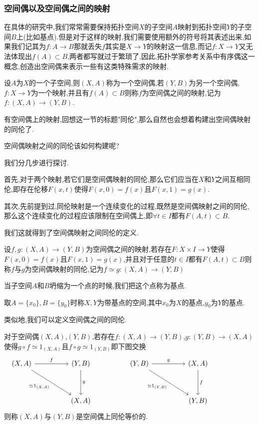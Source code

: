 \documentclass{article}
\begin{document}
\subsubsection{空间偶以及空间偶之间的映射}
在具体的研究中,我们常常需要保持拓扑空间$X$的子空间$A$映射到拓扑空间$Y$的子空间$B$上(比如基点).但是对于这样的映射,我们需要使用额外的符号将其表述出来,如果我们记其为$f : A \to B$那就丢失$f$其实是$X \to Y$的映射这一信息,而记$f : X \to Y$又无法体现出$f(A) \subset B$,两者都写就过于繁琐了,因此,拓扑学家参考关系中有序偶这一概念,创造出空间偶来表示一些有这类特殊需求的映射.

\begin{definition}
    设$A$为$X$的一个子空间,则$(X,A)$称为一个空间偶,若$(Y,B)$为另一个空间偶,$f : X \to Y$为一个映射,并且有$f(A) \subset B$则称$f$为空间偶之间的映射,记为$f: (X,A) \to (Y,B)$.
    \label{Def:1.2.4}
\end{definition}

有空间偶上的映射,回想这一节的标题"同伦",那么自然也会想着构建出空间偶映射的同伦了.


空间偶映射之间的同伦该如何构建呢?


我们分几步进行探讨.


首先,对于两个映射,若它们是空间偶映射的同伦,那么它们应当在$X$和$Y$之间互相同伦,即存在伦移$F(x,t)$使得$F(x,0) = f(x)$且$F(x,1) = g(x)$.


其次,先前提到过,同伦映射是一个连续变化的过程,既然是空间偶映射之间的同伦,那么这个连续变化的过程应该限制在空间偶上,即$\forall t \in I$都有$F(A,t) \subset B$.


我们这就得到了空间偶映射之间同伦的定义.


\begin{definition}
    设$f,g : (X,A) \to (Y,B)$为空间偶之间的映射,若存在$F: X \times I \to Y$使得$F(x,0) = f(x)$且$F(x,1) = g(x)$,并且对于任意的$t \in I$都有$F(A,t) \subset B$则称$f$与$g$为空间偶映射的同伦,记为$f\simeq g:(X,A) \to (Y,B)$
\end{definition}

当子空间$A$和$B$坍缩为一个点的时候,我们把这个点称为基点.

\begin{definition}
    取$A = \{x_0\}, B = \{y_0\}$时称$X,Y$为带基点的空间,其中$x_0$为$X$的基点,$y_0$为$Y$的基点.
\end{definition}

类似地,我们可以定义空间偶之间的同伦.

\begin{definition}
    对于空间偶$(X,A)$,$(Y,B)$,若存在$f :(X,A) \to (Y,B)$,$g : (Y,B) \to (X,A)$使得$g \circ f\simeq 1_{(X,A)}$且$f \circ g \simeq 1_{(Y,B)}$即下图交换
    \[\begin{tikzcd}
	{(X,A)} && {(Y,B)} && {(Y,B)} && {(X,A)} \\
	\\
	&& {(X,A)} &&&& {(Y,B)} 
	&& {}
	\arrow["g", from=1-3, to=3-3]
	\arrow["f", from=1-1, to=1-3]
	\arrow["{\simeq1_{(X,A)}}"', from=1-1, to=3-3]
	\arrow["g", from=1-5, to=1-7]
	\arrow["f", from=1-7, to=3-7]
	\arrow["{\simeq 1_{(Y,B)}}"', from=1-5, to=3-7]
\end{tikzcd}\]
则称$(X,A)$与$(Y,B)$是空间偶上同伦等价的.
\end{definition}
\end{document}
